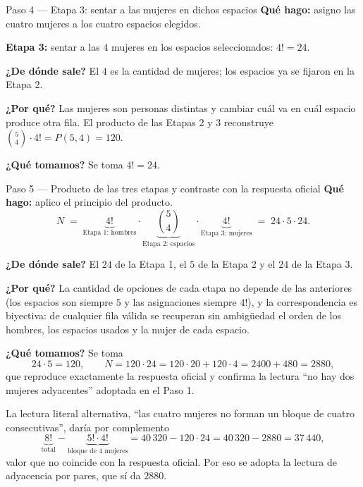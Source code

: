 \documentclass[11pt]{article}
\begin{document}
\begin{paso}{Paso 4 --- Etapa 3: sentar a las mujeres en dichos espacios}
\textbf{Qué hago:} asigno las cuatro mujeres a los cuatro espacios elegidos.

\medskip
\textbf{Etapa 3:} sentar a las $4$ mujeres en los espacios seleccionados: $4!=24$.

\textbf{¿De dónde sale?} El $4$ es la cantidad de mujeres; los espacios ya se fijaron en la Etapa 2.

\textbf{¿Por qué?} Las mujeres son personas distintas y cambiar cuál va en cuál espacio produce otra fila. El producto de las Etapas 2 y 3 reconstruye $\binom{5}{4}\cdot 4! = P(5,4) = 120$.

\textbf{¿Qué tomamos?} Se toma $4!=24$.
\end{paso}

\begin{paso}{Paso 5 --- Producto de las tres etapas y contraste con la respuesta oficial}
\textbf{Qué hago:} aplico el principio del producto.
\[
  N \;=\; \underbrace{4!}_{\text{Etapa 1: hombres}} \cdot \underbrace{\binom{5}{4}}_{\text{Etapa 2: espacios}} \cdot \underbrace{4!}_{\text{Etapa 3: mujeres}} \;=\; 24\cdot 5\cdot 24 .
\]

\textbf{¿De dónde sale?} El $24$ de la Etapa 1, el $5$ de la Etapa 2 y el $24$ de la Etapa 3.

\textbf{¿Por qué?} La cantidad de opciones de cada etapa no depende de las anteriores (los espacios son siempre $5$ y las asignaciones siempre $4!$), y la correspondencia es biyectiva: de cualquier fila válida se recuperan sin ambigüedad el orden de los hombres, los espacios usados y la mujer de cada espacio.

\textbf{¿Qué tomamos?} Se toma
\[
  24\cdot 5 = 120,\qquad N = 120\cdot 24 = 120\cdot 20 + 120\cdot 4 = 2400+480 = 2880 ,
\]
que reproduce exactamente la respuesta oficial y confirma la lectura ``no hay dos mujeres adyacentes'' adoptada en el Paso 1.
\end{paso}

\begin{nota}
La lectura literal alternativa, ``las cuatro mujeres no forman un bloque de cuatro consecutivas'', daría por complemento
\[
  \underbrace{8!}_{\text{total}} - \underbrace{5!\cdot 4!}_{\text{bloque de 4 mujeres}} = 40\,320 - 120\cdot 24 = 40\,320-2880 = 37\,440 ,
\]
valor que no coincide con la respuesta oficial. Por eso se adopta la lectura de adyacencia por pares, que sí da $2880$.
\end{nota}
\end{document}

